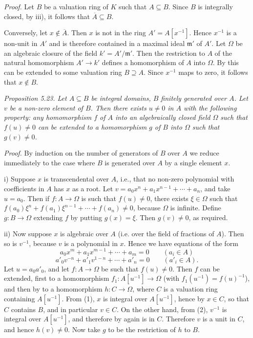 \noindent\textit{Proof.} Let $B$ be a valuation ring of $K$ such that $A\subseteq B$. Since $B$ is integrally closed, by  iii), it follows that $\overline A\subseteq B$.

Conversely, let $x\notin\overline A$. Then $x$ is not in the ring $A'=A[x^{-1}]$. Hence $x^{-1}$ is a non-unit in $A'$ and is therefore contained in a maximal ideal $\mathfrak m'$ of $A'$. Let $\Omega$ be an algebraic closure of the field $k'=A'/\mathfrak m'$. Then the restriction to $A$ of the natural homomorphism $A'\longrightarrow k'$ defines a homomorphism of $A$ into $\Omega$. By  this can be extended to some valuation ring $B\supseteq A$. Since $x^{-1}$ maps to zero, it follows that $x\notin B$. \proofbox

\noindent\textit{Proposition 5.23. Let $A\subseteq B$ be integral domains, $B$ finitely generated over $A$. Let $v$ be a non-zero element of $B$. Then there exists $u\neq0$ in $A$ with the following property: any homomorphism $f$ of $A$ into an algebraically closed field $\Omega$ such that $f(u)\neq0$ can be extended to a homomorphism $g$ of $B$ into $\Omega$ such that $g(v)\neq0$.}

\noindent\textit{Proof.} By induction on the number of generators of $B$ over $A$ we reduce immediately to the case where $B$ is generated over $A$ by a single element $x$.

i) Suppose $x$ is transcendental over $A$, i.e., that no non-zero polynomial with coefficients in $A$ has $x$ as a root. Let $v=a_0x^n+a_1x^{n-1}+\cdots+a_n$, and take $u=a_0$. Then if $f:A\longrightarrow\Omega$ is such that $f(u)\neq0$, there exists $\xi\in\Omega$ such that $f(a_0)\xi^n+f(a_1)\xi^{n-1}+\cdots+f(a_n)\neq0$, because $\Omega$ is infinite. Define $g:B\longrightarrow\Omega$ extending $f$ by putting $g(x)=\xi$. Then $g(v)\neq0$, as required.

ii) Now suppose $x$ is algebraic over $A$ (i.e. over the field of fractions of $A$). Then so is $v^{-1}$, because $v$ is a polynomial in $x$. Hence we have equations of the form
\begin{equation}
 a_0x^m+a_1x^{m-1}+\cdots+a_m=0\qquad(a_i\in A)
 \tag{1}
\end{equation}
\begin{equation}
 a'_0v^{-n}+a'_1v^{1-n}+\cdots+a'_n=0\qquad(a'_i\in A).
 \tag{2}
\end{equation}
Let $u=a_0a'_0$, and let $f:A\longrightarrow\Omega$ be such that $f(u)\neq0$. Then $f$ can be extended, first to a homomorphism $f_1:A[u^{-1}]\longrightarrow\Omega$ (with $f_1(u^{-1})=f(u)^{-1}$), and then by  to a homomorphism $h:C\longrightarrow\Omega$, where $C$ is a valuation ring containing $A[u^{-1}]$. From (1), $x$ is integral over $A[u^{-1}]$, hence by  $x\in C$, so that $C$ contains $B$, and in particular $v\in C$. On the other hand, from (2), $v^{-1}$ is integral over $A[u^{-1}]$, and therefore by  again is in $C$. Therefore $v$ is a unit in $C$, and hence $h(v)\neq0$. Now take $g$ to be the restriction of $h$ to $B$. \proofbox

